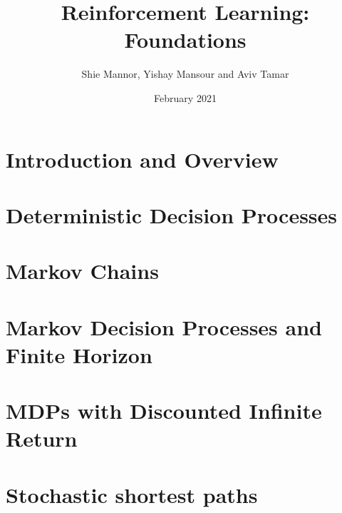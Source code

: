 \documentclass[12pt]{book}
\title{Reinforcement Learning: Foundations}
\date{February 2021}                                           %
\author{Shie Mannor, Yishay Mansour and Aviv Tamar}
\begin{document}
\maketitle

\tableofcontents

\chapter{Introduction and Overview}
\label{chapter:intro}


\chapter{Deterministic Decision Processes}
\label{chapter:DDP}


%
%

\chapter{Markov Chains}
\label{chapter:MC}


\chapter{Markov Decision Processes and Finite Horizon}
\label{chapter:MDP-FH}



%
%

\chapter{MDPs with Discounted Infinite Return}
\label{chapter:disc}

%

\chapter{Stochastic shortest paths}
\label{chapter:ssp}

\end{document}
